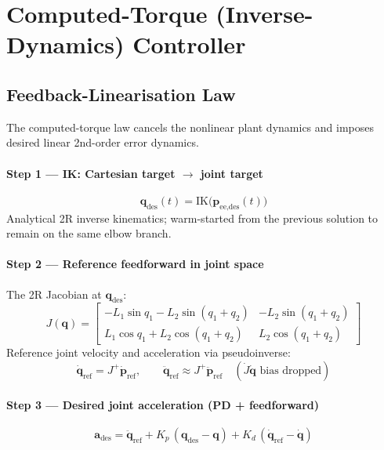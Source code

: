 \documentclass[11pt, a4paper]{article}
\begin{document}
\section{Computed-Torque (Inverse-Dynamics) Controller}

\subsection{Feedback-Linearisation Law}

The computed-torque law cancels the nonlinear plant dynamics and imposes
desired linear 2nd-order error dynamics.

\paragraph{Step 1 — IK: Cartesian target $\to$ joint target}
\begin{equation}
  \bm{q}_\text{des}(t) = \text{IK}\bigl(\bm{p}_\text{ee,des}(t)\bigr)
  \label{eq:ik}
\end{equation}
Analytical 2R inverse kinematics; warm-started from the previous solution to
remain on the same elbow branch.

\paragraph{Step 2 — Reference feedforward in joint space}

The 2R Jacobian at $\bm{q}_\text{des}$:
\begin{equation}
  J(\bm{q}) =
  \begin{bmatrix}
    -L_1\sin q_1 - L_2\sin(q_1+q_2) & -L_2\sin(q_1+q_2) \\
     L_1\cos q_1 + L_2\cos(q_1+q_2) &  L_2\cos(q_1+q_2)
  \end{bmatrix}
  \label{eq:jacobian}
\end{equation}
Reference joint velocity and acceleration via pseudoinverse:
\begin{equation}
  \dot{\bm{q}}_\text{ref} = J^+ \dot{\bm{p}}_\text{ref}, \qquad
  \ddot{\bm{q}}_\text{ref} \approx J^+ \ddot{\bm{p}}_\text{ref}
  \quad (\dot{J}\dot{\bm{q}}\text{ bias dropped})
  \label{eq:jac-inv}
\end{equation}

\paragraph{Step 3 — Desired joint acceleration (PD + feedforward)}
\begin{equation}
  \boxed{\bm{a}_\text{des} = \ddot{\bm{q}}_\text{ref}
    + K_p\,(\bm{q}_\text{des} - \bm{q})
    + K_d\,(\dot{\bm{q}}_\text{ref} - \dot{\bm{q}})}
  \label{eq:a-des}
\end{equation}
\end{document}
